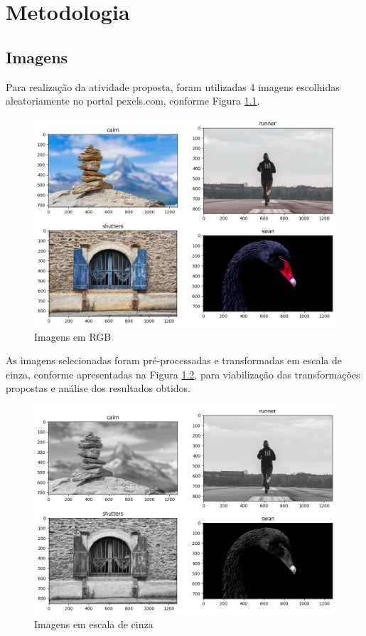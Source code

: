 \chapter[Metodologia]{Metodologia}
\label{chap:metodologia}

\section{Imagens}
\label{sec:imagens}

Para realização da atividade proposta, foram utilizadas 4 imagens escolhidas aleatoriamente no portal pexels.com, conforme Figura \ref{imagens-rgb}.

\begin{figure}[!htpb]
 \centering
 \includegraphics[scale=0.5]{Elementos/Figuras/metodologia-originais-rgb.png}
 \caption{Imagens em RGB}
 \label{imagens-rgb}
\end{figure}

As imagens selecionadas foram pré-processadas e transformadas em escala de cinza, conforme apresentadas na Figura \ref{imagens-gray}, para viabilização das transformações propostas e análise dos resultados obtidos.

\begin{figure}[!htpb]
 \centering
 \includegraphics[scale=0.5]{Elementos/Figuras/imagens-originais-gray.png}
 \caption{Imagens em escala de cinza}
 \label{imagens-gray}
\end{figure}

